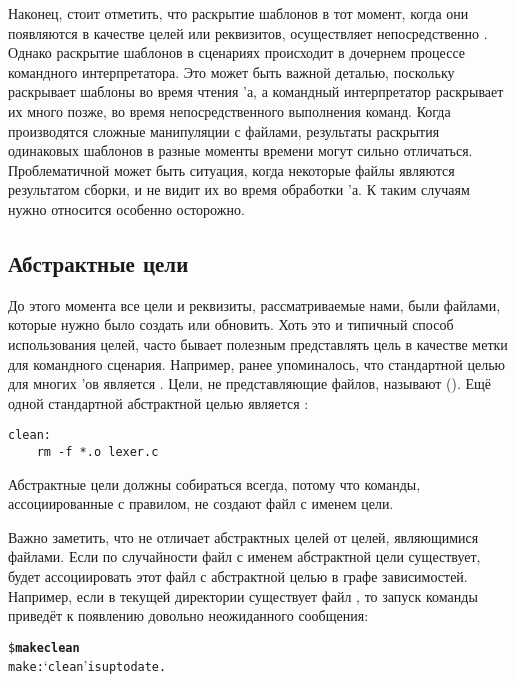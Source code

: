 Наконец, стоит отметить, что раскрытие шаблонов в тот момент, когда
они появляются в качестве целей или реквизитов, осуществляет
непосредственно \GNUmake{}. Однако раскрытие шаблонов в сценариях
происходит в дочернем процессе командного интерпретатора. Это может
быть важной деталью, поскольку \GNUmake{} раскрывает шаблоны во время
чтения \Makefile{}'а, а командный интерпретатор раскрывает их много
позже, во время непосредственного выполнения команд. Когда
производятся сложные манипуляции с файлами, результаты раскрытия
одинаковых шаблонов в разные моменты времени могут сильно отличаться.
Проблематичной может быть ситуация, когда некоторые файлы являются
результатом сборки, и \GNUmake{} не видит их во время обработки
\Makefile{}'а. К таким случаям нужно относится особенно осторожно.

\subsection{Абстрактные цели}
\label{sec:phony_targets}
До этого момента все цели и реквизиты, рассматриваемые нами, были
файлами, которые нужно было создать или обновить. Хоть это и типичный
способ использования целей, часто бывает полезным представлять цель в
качестве метки для командного сценария. Например, ранее упоминалось,
что стандартной целью для многих \Makefile{}'ов является .
Цели, не представляющие файлов, называют 
(). Ещё одной стандартной абстрактной целью
является :

{\footnotesize
\begin{verbatim}
clean:
    rm -f *.o lexer.c
\end{verbatim}
}

Абстрактные цели должны собираться всегда, потому что команды,
ассоциированные с правилом, не создают файл с именем цели.

Важно заметить, что \GNUmake{} не отличает абстрактных целей от
целей, являющимися файлами. Если по случайности файл с именем
абстрактной цели существует, \GNUmake{} будет ассоциировать этот файл
с абстрактной целью в графе зависимостей. Например, если в текущей
директории существует файл , то запуск команды
 приведёт к появлению довольно неожиданного
сообщения:

{\footnotesize
\begin{alltt}
\$ \textbf{make clean}
make: `clean' is up to date.
\end{alltt}
}

